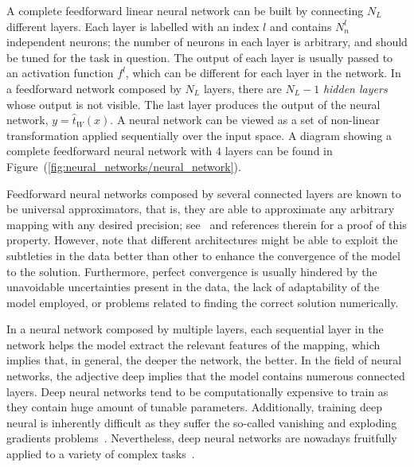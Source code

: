 \begin{figure}[H]
\end{figure}

A complete feedforward linear neural network can be built by connecting $N_L$ different layers. Each layer is
labelled with an index $l$ and contains $N_{n}^{l}$ independent neurons; the number of neurons in each layer
is arbitrary, and should be tuned for the task in question. The output of each layer is usually passed to an
activation function $f^l$, which can be different for each layer in the network. In a feedforward network
composed by $N_L$ layers, there are $N_L - 1$ \textit{hidden layers} whose output is not visible. The last
layer produces the output of the neural network, $y = \hat{t}_W(x)$. A neural network can be viewed as a set
of non-linear transformation applied sequentially over the input space. A diagram showing a complete
feedforward neural network with $4$ layers can be found in Figure~(\ref{fig:neural_networks/neural_network}).

Feedforward neural networks composed by several connected layers are known to be universal approximators, that
is, they are able to approximate any arbitrary mapping with any desired precision;
see~\cite{hornik1989multilayer} and references therein for a proof of this property. However, note that
different architectures might be able to exploit the subtleties in the data better than other to enhance the
convergence of the model to the solution. Furthermore, perfect convergence is usually hindered by the
unavoidable uncertainties present in the data, the lack of adaptability of the model employed, or problems
related to finding the correct solution numerically. 

In a neural network composed by multiple layers, each sequential layer in the network helps the model extract
the relevant features of the mapping, which implies that, in general, the deeper the network, the better. In
the field of neural networks, the adjective deep implies that the model contains numerous connected layers.
Deep neural networks tend to be computationally expensive to train as they contain huge amount of tunable
parameters. Additionally, training deep neural is inherently difficult as they suffer the so-called vanishing
and exploding gradients problems~\cite{glorot2010understanding}. Nevertheless, deep neural networks are
nowadays fruitfully applied to a variety of complex tasks~\cite{samek2021explaining, canziani2016analysis}.

